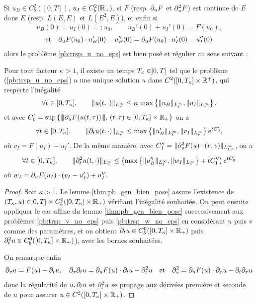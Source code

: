 \begin{theorem} \label{thm:regularite_u_no_eps}
Si $u_B\in C^2_b([0,T])$, $u_I\in C^2_b(\mathbb{R}_+)$, 
si $F$ (resp. $\partial_{u} F$ et $\partial_{u}^2 F$) est continue de $E$ dans $E$ (resp. $L(E,E)$ et $L(E^2,E)$), et enfin si 
$$u_B(0) = u_I(0) =: u_0, \qquad u_B'(0) + u_I'(0) = F(u_0),$$
$$ \text{et}\quad %
\dpu F(u_0)\cdot u_B'(0) - u_B''(0) = %
\dpu F(u_0)\cdot u_I'(0) - u_I''(0) $$
alors le problème \eqref{pb:trsp_u_no_eps} est bien posé et régulier au sens suivant :

Pour tout facteur $\kappa > 1$, il existe un temps $T_{\kappa}\in]0,T]$ tel que le problème (\ref{pb:trsp_u_no_eps}) a une unique solution $u$ dans $C^2([0,T_{\kappa}]\times\mathbb{R}^+)$, qui respecte l'inégalité 
\begin{equation}
\forall t\in [0,T_{\kappa}], \qquad \|u(t,\cdot) \|_{L^{\infty}_{\tau}} \leq \kappa\, \max\left\{ \|u_B\|_{L^{\infty}_t}, \|u_I\|_{L^{\infty}_{\tau}} \right\}. 
\label{eq:ineg_u_no_eps}
\end{equation}
et avec $C_0' = \sup\left\{{\left\vert\kern-0.25ex\left\vert\kern-0.25ex\left\vert \partial_{u} F(u(t,\tau)) \right\vert\kern-0.25ex\right\vert\kern-0.25ex\right\vert},\, (t,\tau)\in [0,T_{\kappa}]\times\mathbb{R}_+ \right\}$ on a 
\begin{equation}
\forall t\in[0,T_{\kappa}], \qquad \|\partial_t u(t,\cdot)\|_{L^{\infty}_{\tau}} \leq \max \left\{\|u_B'\|_{L^{\infty}_t}, \|v_I\|_{L^{\infty}_{\tau}} \right\} e^{t C_0'},
\end{equation}
où $v_I = F(u_I) - u_I'$. De la même manière, avec $C_1'' = \| \partial_{u}^2 F(u)\cdot(v,v )\|_{L_{t,\tau}^{\infty}}$, on a 
\begin{equation}
\forall t\in[0,T_{\kappa}], \qquad \|\partial_t^2 u(t,\cdot)\|_{L^{\infty}_{\tau}} \leq \left( \max \left\{\|u_B''\|_{L^{\infty}_t}, \|w_I\|_{L^{\infty}_{\tau}} \right\} + t C_1'' \right) e^{t C_0'}
\end{equation} 
où $w_I = \partial_{u} F(u_I)\cdot(v_I - u_I') + u_I''$. 
\end{theorem}

\begin{proof}
Soit $\kappa > 1$. Le lemme \ref{thm:pb_gen_bien_pose} assure l'existence de $(T_{\kappa},u)\in ]0,T]\times C^0_b([0,T_{\kappa}]\times\mathbb{R}_+)$ vérifiant l'inégalité souhaitée. 
On peut ensuite appliquer le cas affine du lemme \ref{thm:pb_gen_bien_pose} successivement aux problèmes \eqref{pb:trsp_v_no_eps} puis \eqref{pb:trsp_w_no_eps} en considérant $u$ puis $v$ comme des paramètres, et on obtient $\partial_t u \in C^0_b([0,T_{\kappa}]\times\mathbb{R}_+)$ puis $\partial_t^2 u\in C^0_b([0,T_{\kappa}]\times\mathbb{R}_+)$), avec les bornes souhaitées. 

On remarque enfin 
$$\partial_{\tau} u = F(u) - \partial_t u, \quad\partial_{\tau} \partial_t u = \partial_{u} F(u)\cdot \partial_t u - \partial_t^2 u \quad\text{et}\quad \partial_{\tau}^2 = \partial_{u} F(u)\cdot \partial_{\tau} u - \partial_t \partial_{\tau} u$$
donc la régularité de $u,\partial_t u$ et $\partial_t^2 u$ se propage aux dérivées première et seconde de $u$ pour assurer $u\in C^2([0,T_{\kappa}]\times\mathbb{R}_+)$. 

\end{proof}

